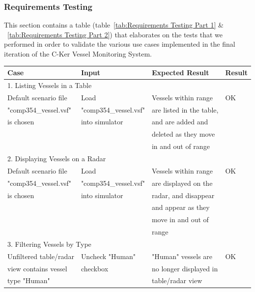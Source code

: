 \documentclass[12pt]{article}
\begin{document}
\subsubsection{Requirements Testing}

This section contains a table (table~\ref{tab:Requirements Testing Part 1} \& ~\ref{tab:Requirements Testing Part 2}) that elaborates on the tests that we performed in order to validate the various use cases implemented in the final iteration of the C-Ker Vessel Monitoring System.

\clearpage

\begin{table}[ht]
\centering
   \begin{tabular}{|l|l|l|l|}
        \hline
        {\large Case} & {\large Input} & {\large Expected Result} & {\large Result}\\
        \hline\hline
        \multicolumn{4}{|l|}{1. Listing Vessels in a Table} \\
        \hline
        Default scenario file & Load & Vessels within range & OK\\
        "comp354\_vessel.vsf" & "comp354\_vessel.vsf" & are listed in the table, & \\
        is chosen &  into simulator &   and are added and &\\
         & & deleted as they move &\\
         & & in and out of range & \\
        \hline
        \multicolumn{4}{|l|}{2. Displaying Vessels on a Radar} \\
        \hline
       Default scenario file & Load & Vessels within range & OK\\
       "comp354\_vessel.vsf" & "comp354\_vessel.vsf" & are displayed on the &\\
       is chosen & into simulator & radar, and disappear &\\
        & & and appear as they & \\
        & & move in and out of & \\
        & & range &\\
        \hline
        \multicolumn{4}{|l|}{3. Filtering Vessels by Type} \\
        \hline
       Unfiltered table/radar  & Uncheck "Human"  & "Human" vessels are  & OK\\
       view contains vessel  & checkbox & no longer displayed in & \\
       type "Human" &  & table/radar view &\\

\end{tabular}
\end{table}
\end{document}
